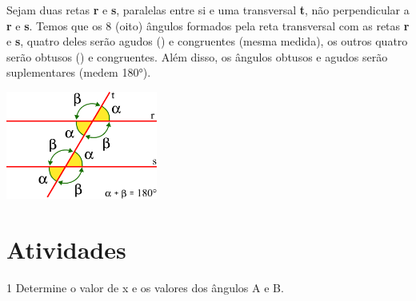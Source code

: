 \begin{escolha}
\begin{boxmedio}
\begin{boxmedio}
{\begin{boxpeq}
\begin{boxpeq}
{\begin{boxpeq}
\begin{boxmedio}
\begin{boxmedio}
\begin{boxpeq}
\begin{boxmedio}
\begin{boxpeq}
\begin{boxpeq}
\begin{boxpeq}
\begin{boxpeq}
\begin{boxmedio}
{\begin{boxmedio}
\begin{boxmedio}
\begin{boxpeq}
\begin{boxmedio}
\begin{boxpeq}
\begin{boxpeq}
\begin{boxpeq}
\begin{escolha}
{\begin{boxmedio}
\begin{boxpeq}
\begin{boxpeq}
\begin{boxpeq}
\begin{boxpeq}
\begin{boxpeq}
\begin{boxmedio}
\begin{boxpeq}
\begin{boxpeq}
\begin{boxpeq}
{\begin{boxpeq}
\begin{boxmedio}
\begin{boxpeq}
\begin{boxpeq}
\begin{boxpeq}
{\begin{boxpeq}
\begin{boxmedio}
{\begin{boxpeq}
\begin{boxpeq}
\begin{boxmedio}
\begin{boxmedio}
\begin{boxpeq}
\begin{boxpeq}
{\begin{boxpeq}
\begin{boxpeq}
\begin{boxpeq}
\begin{boxpeq}
\begin{boxpeq}
\begin{escolha}
\begin{escolha}
{\begin{itemize}
Sejam duas retas \textbf{r} e \textbf{s}, paralelas entre si e uma transversal 
\textbf{t}, não perpendicular a \textbf{r} e \textbf{s}. Temos que os 8 (oito)
ângulos formados pela reta transversal com as retas \textbf{r} e \textbf{s}, 
quatro deles serão agudos (\alpha) e congruentes (mesma medida), os outros quatro
serão obtusos (\beta) e congruentes. Além disso, os ângulos obtusos e agudos serão 
suplementares (medem 180°).

\includegraphics[width=1.96354in,height=1.3968in]{./_SAEB_9_MAT/media/image186.png}

\end{itemize}


\section{Atividades}

\num{1} Determine o valor de x e os valores dos ângulos A e B.

}
\end{escolha}
\end{escolha}
\end{boxpeq}
\end{boxpeq}
\end{boxpeq}
\end{boxpeq}
\end{boxpeq}}
\end{boxpeq}
\end{boxpeq}
\end{boxmedio}
\end{boxmedio}
\end{boxpeq}
\end{boxpeq}}
\end{boxmedio}
\end{boxpeq}}
\end{boxpeq}
\end{boxpeq}
\end{boxpeq}
\end{boxmedio}
\end{boxpeq}}
\end{boxpeq}
\end{boxpeq}
\end{boxpeq}
\end{boxmedio}
\end{boxpeq}
\end{boxpeq}
\end{boxpeq}
\end{boxpeq}
\end{boxpeq}
\end{boxmedio}}
\end{escolha}
\end{boxpeq}
\end{boxpeq}
\end{boxpeq}
\end{boxmedio}
\end{boxpeq}
\end{boxmedio}
\end{boxmedio}}
\end{boxmedio}
\end{boxpeq}
\end{boxpeq}
\end{boxpeq}
\end{boxpeq}
\end{boxmedio}
\end{boxpeq}
\end{boxmedio}
\end{boxmedio}
\end{boxpeq}}
\end{boxpeq}
\end{boxpeq}}
\end{boxmedio}
\end{boxmedio}
\end{escolha}
